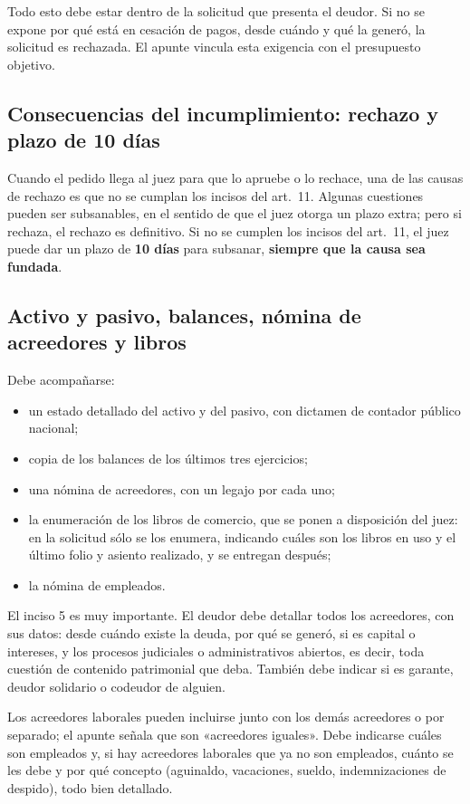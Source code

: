 \documentclass[12pt,oneside]{book}
\begin{document}
Todo esto debe estar dentro de la solicitud que presenta el deudor. Si no se expone por qué está en cesación de pagos, desde cuándo y qué la generó, la solicitud es rechazada. El apunte vincula esta exigencia con el presupuesto objetivo.

\subsection{Consecuencias del incumplimiento: rechazo y plazo de 10 días}

Cuando el pedido llega al juez para que lo apruebe o lo rechace, una de las causas de rechazo es que no se cumplan los incisos del art.~11. Algunas cuestiones pueden ser subsanables, en el sentido de que el juez otorga un plazo extra; pero si rechaza, el rechazo es definitivo. Si no se cumplen los incisos del art.~11, el juez puede dar un plazo de \textbf{10 días} para subsanar, \textbf{siempre que la causa sea fundada}.

\subsection{Activo y pasivo, balances, nómina de acreedores y libros}

Debe acompañarse:
\begin{itemize}
    \item un estado detallado del activo y del pasivo, con dictamen de contador público nacional;
    \item copia de los balances de los últimos tres ejercicios;
    \item una nómina de acreedores, con un legajo por cada uno;
    \item la enumeración de los libros de comercio, que se ponen a disposición del juez: en la solicitud sólo se los enumera, indicando cuáles son los libros en uso y el último folio y asiento realizado, y se entregan después;
    \item la nómina de empleados.
\end{itemize}

El inciso 5 es muy importante. El deudor debe detallar todos los acreedores, con sus datos: desde cuándo existe la deuda, por qué se generó, si es capital o intereses, y los procesos judiciales o administrativos abiertos, es decir, toda cuestión de contenido patrimonial que deba. También debe indicar si es garante, deudor solidario o codeudor de alguien.

Los acreedores laborales pueden incluirse junto con los demás acreedores o por separado; el apunte señala que son «acreedores iguales». Debe indicarse cuáles son empleados y, si hay acreedores laborales que ya no son empleados, cuánto se les debe y por qué concepto (aguinaldo, vacaciones, sueldo, indemnizaciones de despido), todo bien detallado.
\end{document}
